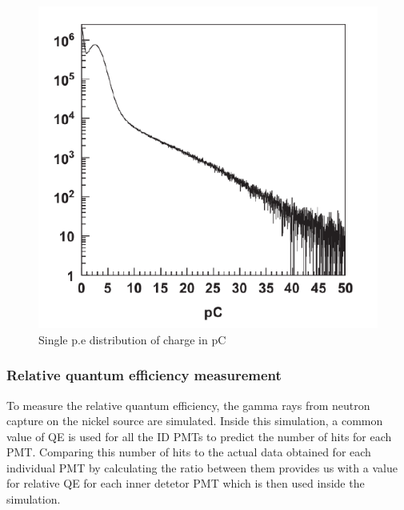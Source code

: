 \begin{figure}
    \includegraphics[width=\textwidth]{Figures/singlepe.png}
\caption{Single p.e distribution of charge in pC }
    \label{fig:singlepe}
\end{figure}



\subsubsection{Relative quantum efficiency measurement}

To measure the relative quantum efficiency, the gamma rays from neutron capture on the nickel source are simulated. Inside this simulation, a common value of QE is used for all the ID PMTs to predict the number of hits for each PMT. Comparing this number of hits to the actual data obtained for each individual PMT by calculating the ratio between them provides us with a value for relative QE for each inner detetor PMT which is then used inside the simulation. 

